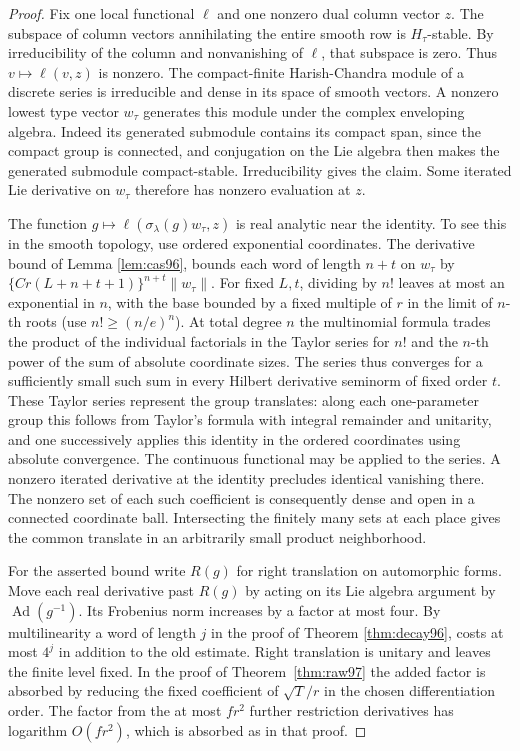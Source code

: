 \documentclass[a4paper,11pt]{article}
\theoremstyle{definition}
\theoremstyle{remark}
\numberwithin{equation}{section}
\begin{document}
\begin{proof}
Fix one local functional \(\ell\) and one nonzero dual column
vector \(z\). The subspace of column vectors annihilating the
entire smooth row is \(H_\tau\)-stable. By irreducibility of the
column and nonvanishing of \(\ell\), that subspace is zero.
Thus \(v\mapsto\ell(v,z)\) is nonzero. The compact-finite
Harish-Chandra module of a discrete series is irreducible
and dense in its space of smooth vectors. A nonzero lowest
type vector \(w_\tau\) generates this module under the complex
enveloping algebra. Indeed its generated submodule contains
its compact span, since the compact group is connected, and
conjugation on the Lie algebra then makes the generated
submodule compact-stable. Irreducibility gives the claim.
Some iterated Lie derivative on \(w_\tau\) therefore has
nonzero evaluation at \(z\).

The function \(g\mapsto\ell(\sigma_\lambda(g)w_\tau,z)\)
is real analytic near the identity. To see this in the smooth
topology, use ordered exponential coordinates. The derivative
bound of Lemma \ref{lem:cas96}, bounds each word of length
\(n+t\) on \(w_\tau\) by \(\{Cr(L+n+t+1)\}^{n+t}\|w_\tau\|\).
For fixed \(L,t\), dividing by \(n!\) leaves at most an exponential
in \(n\), with the base bounded by a fixed multiple of \(r\) in
the limit of \(n\)-th roots (use \(n!\ge(n/e)^n\)).
At total degree \(n\) the multinomial formula trades the product
of the individual factorials in the Taylor series for \(n!\)
and the \(n\)-th power of the sum of absolute coordinate sizes.
The series thus converges for a sufficiently small such sum in
every Hilbert derivative seminorm of fixed order \(t\).
These Taylor series represent the group translates: along
each one-parameter group this follows from Taylor's formula
with integral remainder and unitarity, and one successively
applies this identity in the ordered coordinates using absolute
convergence. The continuous functional may be applied to the
series. A nonzero iterated derivative at the identity precludes
identical vanishing there. The nonzero set of each such coefficient
is consequently dense and open in a connected coordinate ball.
Intersecting the finitely many sets at each place gives the
common translate in an arbitrarily small product neighborhood.

For the asserted bound write \(R(g)\) for right translation on
automorphic forms. Move each real derivative past \(R(g)\) by
acting on its Lie algebra argument by \(\operatorname{Ad}(g^{-1})\).
Its Frobenius norm increases by a factor at most four. By
multilinearity a word of length \(j\) in the proof of Theorem \ref{thm:decay96}, costs at most \(4^j\) in addition to the old
estimate. Right translation is unitary and leaves the finite
level fixed. In the proof of Theorem~\ref{thm:raw97} the added
factor is absorbed by reducing the fixed coefficient of
\(\sqrt T/r\) in the chosen differentiation order. The factor
from the at most \(fr^2\) further restriction derivatives has
logarithm \(O(fr^2)\), which is absorbed as in that proof.
\end{proof}
\end{document}
